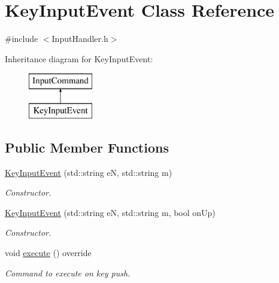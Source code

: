 \hypertarget{class_key_input_event}{}\section{Key\+Input\+Event Class Reference}
\label{class_key_input_event}


{\ttfamily \#include $<$Input\+Handler.\+h$>$}

Inheritance diagram for Key\+Input\+Event\+:\begin{figure}[H]
\begin{center}
\leavevmode
\includegraphics[height=2.000000cm]{class_key_input_event}
\end{center}
\end{figure}
\subsection*{Public Member Functions}
\begin{DoxyCompactItemize}
\item 
\mbox{\label{class_key_input_event_a1efbabce2c329de646985d2866bc349b}} 
\mbox{\hyperlink{class_key_input_event_a1efbabce2c329de646985d2866bc349b}{Key\+Input\+Event}} (std\+::string eN, std\+::string m)
\begin{DoxyCompactList}\small\item\em Constructor. \end{DoxyCompactList}\item 
\mbox{\label{class_key_input_event_a1275e31313079f5258618302153c0d88}} 
\mbox{\hyperlink{class_key_input_event_a1275e31313079f5258618302153c0d88}{Key\+Input\+Event}} (std\+::string eN, std\+::string m, bool on\+Up)
\begin{DoxyCompactList}\small\item\em Constructor. \end{DoxyCompactList}\item 
\mbox{\label{class_key_input_event_ae607856dd9443a66ee1a1f6446f964cc}} 
void \mbox{\hyperlink{class_key_input_event_ae607856dd9443a66ee1a1f6446f964cc}{execute}} () override
\begin{DoxyCompactList}\small\item\em Command to execute on key push. \end{DoxyCompactList}\end{DoxyCompactItemize}
